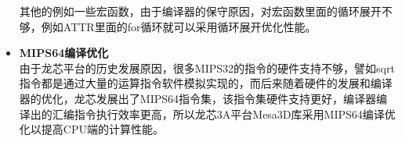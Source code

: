 \begin{itemize}
其他的例如一些宏函数，由于编译器的保守原因，对宏函数里面的循环展开不够，例如ATTR里面的for循环就可以采用循环展开优化性能。

\item{\textbf{MIPS64编译优化}} \\
由于龙芯平台的历史发展原因，很多MIPS32\cite{Mips}的指令的硬件支持不够，譬如sqrt指令都是通过大量的运算指令软件模拟实现的，而后来随着硬件的发展和编译器的优化，龙芯发展出了MIPS64指令集，该指令集硬件支持更好，编译器编译出的汇编指令执行效率更高，所以龙芯3A平台Mesa3D库采用MIPS64编译优化以提高CPU端的计算性能。


\end{itemize}

